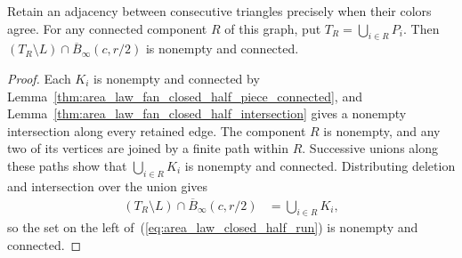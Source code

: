\begin{lemma}
    \label{thm:area_law_fan_closed_half_run_connected}
    \leanok
    Retain an adjacency between consecutive triangles precisely when
    their colors agree. For any connected component $R$ of this graph,
    put $T_R=\bigcup_{i\in R}P_i$. Then
    $(T_R\setminus L)\cap\overline B_\infty(c,r/2)$ is nonempty
    and connected.
\end{lemma}
\begin{proof}
    \leanok
    Each $K_i$ is nonempty and connected by
    Lemma~\ref{thm:area_law_fan_closed_half_piece_connected}, and
    Lemma~\ref{thm:area_law_fan_closed_half_intersection} gives
    a nonempty intersection along every retained edge.
    The component $R$ is nonempty, and any two of its vertices are
    joined by a finite path within $R$. Successive unions along these
    paths show that $\bigcup_{i\in R}K_i$ is nonempty and
    connected. Distributing deletion and intersection over the union
    gives
    \begin{align}
        (T_R\setminus L)\cap\overline B_\infty(c,r/2)
         & =\bigcup_{i\in R}K_i,
        \label{eq:area_law_closed_half_run}
    \end{align}
    so the set on the left of~(\ref{eq:area_law_closed_half_run})
    is nonempty and connected.
\end{proof}


